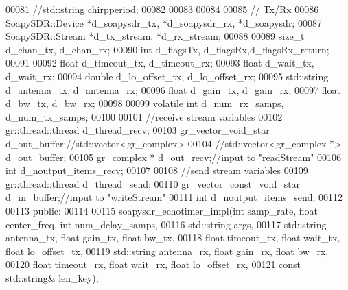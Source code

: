 \begin{DoxyCode}
00081         \textcolor{comment}{//std::string chirpperiod;}
00082 
00083 
00084 
00085         \textcolor{comment}{// Tx/Rx}
00086         SoapySDR::Device *d_soapysdr_tx, *d_soapysdr_rx, *d_soapysdr;
00087         SoapySDR::Stream *d_tx_stream, *d_rx_stream;
00088 
00089         \textcolor{keywordtype}{size\_t} d_chan_tx, d_chan_rx;
00090         \textcolor{keywordtype}{int} d_flagsTx, d_flagsRx,d_flagsRx_return;
00091 
00092         \textcolor{keywordtype}{float} d_timeout_tx, d_timeout_rx;
00093         \textcolor{keywordtype}{float} d_wait_tx, d_wait_rx;
00094         \textcolor{keywordtype}{double} d_lo_offset_tx, d_lo_offset_rx;
00095         std::string d_antenna_tx, d_antenna_rx;
00096         \textcolor{keywordtype}{float} d_gain_tx, d_gain_rx;
00097         \textcolor{keywordtype}{float} d_bw_tx, d_bw_rx;
00098 
00099         \textcolor{keyword}{volatile} \textcolor{keywordtype}{int} d_num_rx_samps, d_num_tx_samps;
00100 
00101         \textcolor{comment}{//receive stream variables}
00102         gr::thread::thread d_thread_recv;
00103         gr\_vector\_void\_star d_out_buffer;\textcolor{comment}{//std::vector<gr\_complex>}
00104         \textcolor{comment}{//std::vector<gr\_complex *> d\_out\_buffer;}
00105         gr\_complex *  d_out_recv;\textcolor{comment}{//input to "readStream"}
00106         \textcolor{keywordtype}{int} d_noutput_items_recv;
00107 
00108         \textcolor{comment}{//send stream variables}
00109         gr::thread::thread d_thread_send;
00110         gr\_vector\_const\_void\_star d_in_buffer;\textcolor{comment}{//input to "writeStream"}
00111         \textcolor{keywordtype}{int} d_noutput_items_send;
00112 
00113     \textcolor{keyword}{public}:
00114 
00115         soapysdr_echotimer_impl(\textcolor{keywordtype}{int} samp_rate, \textcolor{keywordtype}{float} center_freq, \textcolor{keywordtype}{int} 
      num_delay_samps,
00116                                   std::string args,
00117                                   std::string antenna\_tx, \textcolor{keywordtype}{float} gain\_tx, \textcolor{keywordtype}{float} bw\_tx,
00118                                   \textcolor{keywordtype}{float} timeout\_tx, \textcolor{keywordtype}{float} wait_tx, \textcolor{keywordtype}{float} lo\_offset\_tx,
00119                                   std::string antenna\_rx, \textcolor{keywordtype}{float} gain\_rx, \textcolor{keywordtype}{float} bw\_rx,
00120                                   \textcolor{keywordtype}{float} timeout\_rx, \textcolor{keywordtype}{float} wait_rx, \textcolor{keywordtype}{float} lo\_offset\_rx,
00121                                   \textcolor{keyword}{const} std::string& len\_key);

\end{DoxyCode}

